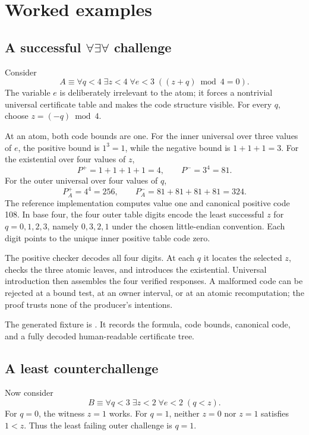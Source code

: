 \section{Worked examples}

\subsection{\texorpdfstring{A successful \(\forall\exists\forall\) challenge}{A successful forall-exists-forall challenge}}

Consider
\[
 A\equiv
 \forall q<4\;\exists z<4\;\forall e<3\;
     ((z+q)\bmod 4=0).
\]
The variable \(e\) is deliberately irrelevant to the atom; it forces a
nontrivial universal certificate table and makes the code structure visible.
For every \(q\), choose \(z=(-q)\bmod4\).

At an atom, both code bounds are one.  For the inner universal over three
values of \(e\), the positive bound is \(1^3=1\), while the negative bound is
\(1+1+1=3\).  For the existential over four values of \(z\),
\[
 P^+=1+1+1+1=4,
 \qquad
 P^-=3^4=81.
\]
For the outer universal over four values of \(q\),
\[
 P_A^+=4^4=256,
 \qquad
 P_A^-=81+81+81+81=324.
\]
The reference implementation computes value one and canonical positive code
108.  In base four, the four outer table digits encode the least successful
\(z\) for \(q=0,1,2,3\), namely \(0,3,2,1\) under the chosen little-endian
convention.  Each digit points to the unique inner positive table code zero.

The positive checker decodes all four digits.  At each \(q\) it locates the
selected \(z\), checks the three atomic leaves, and introduces the existential.
Universal introduction then assembles the four verified responses.  A malformed
code can be rejected at a bound test, at an owner interval, or at an atomic
recomputation; the proof trusts none of the producer's intentions.

The generated fixture is
.  It records the formula,
code bounds, canonical code, and a fully decoded human-readable certificate
tree.

\subsection{A least counterchallenge}

Now consider
\[
 B\equiv
 \forall q<3\;\exists z<2\;\forall e<2\;(q<z).
\]
For \(q=0\), the witness \(z=1\) works.  For \(q=1\), neither \(z=0\) nor
\(z=1\) satisfies \(1<z\).  Thus the least failing outer challenge is
\(q=1\).

